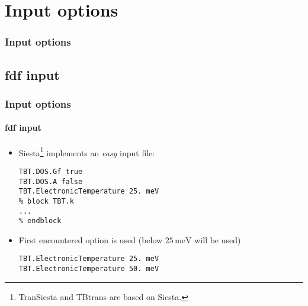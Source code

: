 
\section{Input options}

\begin{framenologo}
  \frametitle{Input options}
  \tableofcontents[currentsection]
\end{framenologo}


\subsection{fdf input}

\begin{frame}[fragile]
  \frametitle{Input options}
  \framesubtitle{fdf input}
  
  \begin{itemize}
    \item Siesta\footnote{TranSiesta and TBtrans are based on Siesta.} implements an
    \emph{easy} input file:
\begin{verbatim}
TBT.DOS.Gf true
TBT.DOS.A false
TBT.ElectronicTemperature 25. meV
% block TBT.k
...
% endblock
\end{verbatim}

    \item First encountered option is used (below $25\,\mathrm{meV}$ will be used)
\begin{verbatim}
TBT.ElectronicTemperature 25. meV
TBT.ElectronicTemperature 50. meV
\end{verbatim}
  \end{itemize}

  
\end{frame}

